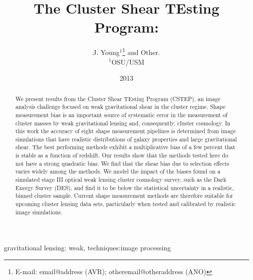 \documentclass[useAMS,usenatbib]{mn2e}
\title[Cluster Shear TEsting Program]{The Cluster Shear TEsting Program: \green{a catchy subtitle here}}
\author[J. Young et al. ]{J. Young$^{1}$\thanks{E-mail:
email@address (AVR); otheremail@otheraddress (ANO)} and 
Other.\\
$^{1}$OSU/USM \\
}
\begin{document}
\date{2013}

\pagerange{\pageref{firstpage}--\pageref{lastpage}} 

\maketitle

\label{firstpage}

\begin{abstract}
We present results from the Cluster Shear TEsting Program (CSTEP), an image
analysis challenge focused on weak gravitational shear in
the cluster regime. Shape measurement bias is an important source of systematic error in the 
measurement of cluster masses by weak gravitational lensing and,
consequently, cluster cosmology. In this work the accuracy of eight shape measurement pipelines is determined from image simulations
that have realistic distributions of galaxy properties and large gravitational shear. The best
performing methods exhibit a multiplicative bias of a few percent that
is stable as a function of redshift. Our results show that the
methods tested here do not have a strong quadratic bias. We find
that the shear bias due to selection effects varies widely
among the methods. We model the impact of the
biases found on a simulated stage III optical weak lensing cluster cosmology survey, such as the Dark Energy Survey (DES), and find it to
be below the statistical uncertainty in a realistic, binned cluster sample. Current shape measurement methods are therefore suitable for upcoming cluster lensing data sets, particularly when tested and calibrated by realistic image simulations.
\end{abstract}

\begin{keywords}
gravitational lensing: weak, techniques:image processing
\end{keywords}


\end{document}
